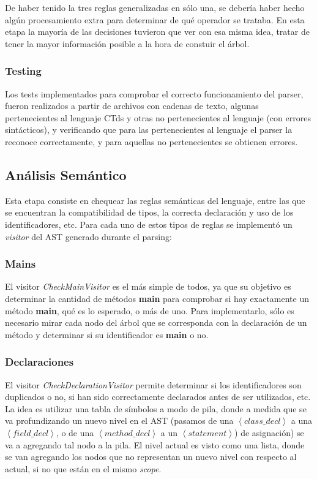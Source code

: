 \documentclass[11pt,a4paper]{article}
\begin{document}
De haber tenido la tres reglas generalizadas en sólo una, se debería haber hecho algún procesamiento extra para determinar de qué operador se trataba. En esta etapa la mayoría de las decisiones tuvieron que ver con esa misma idea, tratar de tener la mayor información posible a la hora de constuir el árbol.

\subsubsection{Testing}

Los tests implementados para comprobar el correcto funcionamiento del parser, fueron realizados a partir de archivos con cadenas de texto, algunas pertenecientes al lenguaje CTds y otras no pertenecientes al lenguaje (con errores sintácticos), y verificando que para las pertenecientes al lenguaje el parser la reconoce correctamente, y para aquellas no pertenecientes se obtienen errores. 

\subsection{Análisis Semántico} 
\label{subsec:semantico}

Esta etapa consiste en chequear las reglas semánticas del lenguaje, entre las que se encuentran la compatibilidad de tipos, la correcta declaración y uso de los identificadores, etc. Para cada uno de estos tipos de reglas se implementó un \textit{visitor} del AST generado durante el parsing: 

\subsubsection{Mains}
\label{mains}
El visitor \textit{CheckMainVisitor} es el más simple de todos, ya que su objetivo es determinar la cantidad de métodos \textbf{main} para comprobar si hay exactamente un método \textbf{main}, qué es lo esperado, o más de uno. Para implementarlo, sólo es necesario mirar cada nodo del árbol que se corresponda con la declaración de un método y determinar si su identificador es \textbf{main} o no.
 
\subsubsection{Declaraciones}
\label{subsec:decls}

El visitor \textit{CheckDeclarationVisitor} permite determinar si los identificadores son duplicados o no, si han sido correctamente declarados antes de ser utilizados, etc. La idea es utilizar una tabla de símbolos a modo de pila, donde a medida que se va profundizando un nuevo nivel en el AST (pasamos de una $\left\langle class\_decl \right\rangle$ a una $\left\langle field\_decl \right\rangle$, o de una $\left\langle method\_decl \right\rangle$ a un $\left\langle statement \right\rangle$) de asignación) se va a agregando tal nodo a la pila. El nivel actual es visto como una lista, donde se van agregando los nodos que no representan un nuevo nivel con respecto al actual, si no que están en el mismo \textit{scope}.
\end{document}
